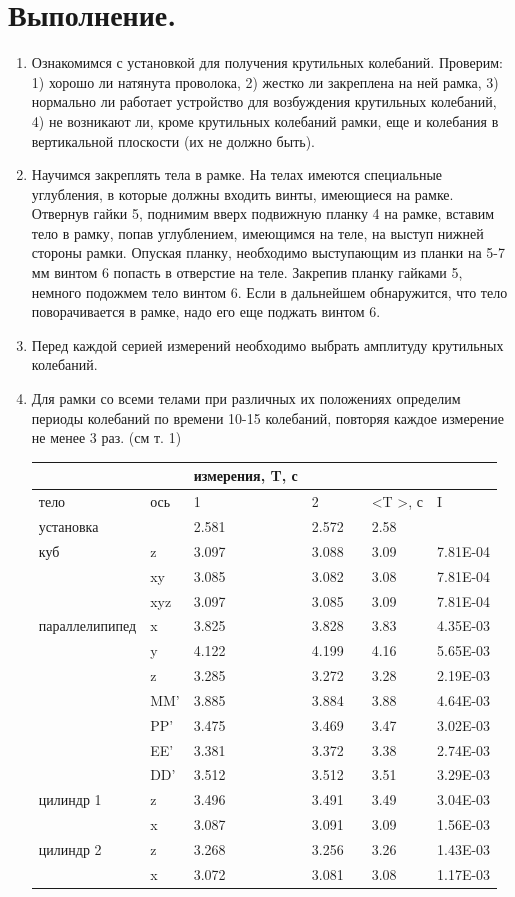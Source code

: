 \documentclass[a4paper,12pt]{article} %
\begin{document}
\section{Выполнение.}
\begin{enumerate}
\item Ознакомимся с установкой для получения крутильных колебаний. Проверим: 1) хорошо ли натянута проволока, 2) жестко ли закреплена на ней рамка, 3) нормально ли работает устройство для возбуждения крутильных колебаний, 4) не возникают ли, кроме крутильных колеба­ний рамки, еще и колебания в вертикальной плоскости (их не должно быть).

\item Научимся закреплять тела в рамке. На телах имеются специальные углубления, в которые должны входить винты, имеющиеся на рамке. Отвернув гайки 5, под­нимим вверх подвижную планку 4 на рамке, вставим тело в рамку, попав углублением, имеющимся на теле, на выступ нижней стороны рамки. Опуская планку, необходимо выступающим из планки на 5-7 мм вин­том 6 попасть в отверстие на теле. Закрепив планку гайками 5, немного подожмем тело винтом 6. Если в дальнейшем обнаружится, что тело поворачивается в рамке, надо его еще поджать винтом 6.

\item Перед каждой серией измерений необходимо выбрать амплитуду крутильных колебаний.

\item Для рамки со всеми телами при различных их положениях определим периоды колебаний по времени 10-15 колебаний, повторяя каждое измерение не менее 3 раз. (см т. 1)
\begin{table} [h]
\center

\begin{tabular}{l|l|lllll}
&&измерения, T, с&&&&\\
\hline
тело&ось&1&2&& \textless T \textgreater, с&I\\
\hline
установка&&2.581&2.572&& 2.58 &\\
куб&z&3.097&3.088&& 3.09 &7.81E-04\\
&xy&3.085&3.082&& 3.08 &7.81E-04\\
&xyz&3.097&3.085&& 3.09 &7.81E-04\\
параллелипипед&x&3.825&3.828&& 3.83 &4.35E-03\\
&y&4.122&4.199&& 4.16 &5.65E-03\\
&z&3.285&3.272&& 3.28 &2.19E-03\\
&MM'&3.885&3.884&& 3.88 &4.64E-03\\
&PP'&3.475&3.469&& 3.47 &3.02E-03\\
&EE'&3.381&3.372&& 3.38 &2.74E-03\\
&DD'&3.512&3.512&& 3.51 &3.29E-03\\
цилиндр 1&z&3.496&3.491&& 3.49 &3.04E-03\\
&x&3.087&3.091&& 3.09 &1.56E-03\\
цилиндр 2&z&3.268&3.256&& 3.26 &1.43E-03\\
&x&3.072&3.081&& 3.08 &1.17E-03\\


\end{tabular}
\end{table}
\end{enumerate}
\end{document}
